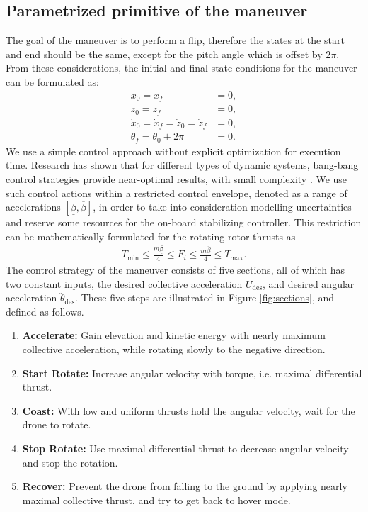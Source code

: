 \subsection{Parametrized primitive of the maneuver}\label{sec:sections}
The goal of the maneuver is to perform a flip, therefore the states at the start and end should be the same, except for the pitch angle which is offset by $2\pi$. From these considerations, the initial and final state conditions for the maneuver can be formulated as:
\begin{subequations}
\begin{align}
x_0 = x_f &= 0,\\
z_0 = z_f &= 0,\\
\dot{x}_0 = \dot{x}_f = \dot{z}_0 = \dot{z}_f &= 0,\\
\theta_f = \theta_0 + 2\pi &= 0.
\end{align}
\end{subequations}
We use a simple control approach without explicit optimization for execution time. Research has shown that for different types of dynamic systems, bang-bang control strategies provide near-optimal results, with small complexity \cite{KALMARNAGY2004,tdk2019}. We use such control actions within a restricted control envelope, denoted as a range of accelerations $[\underline{\beta},\overline{\beta}]$, in order to take into consideration modelling uncertainties and reserve some resources for the on-board stabilizing controller. This restriction can be mathematically formulated for the rotating rotor thrusts as
\begin{align}
T_\mathrm{min} \leq \frac{m\underline{\beta}}{4}\leq F_{i} \leq\frac{m\overline{\beta}}{4} \leq T_\mathrm{max}.
\end{align}
The control strategy of the maneuver consists of five sections, all of which has two constant inputs, the desired collective acceleration $U_\mathrm{des}$, and desired angular acceleration $\ddot{\theta}_\mathrm{des}$. These five steps are illustrated in Figure \ref{fig:sections}, and defined as follows.
\renewcommand{\baselinestretch}{0.85}\normalsize 
\begin{enumerate}
\item \textbf{Accelerate:} Gain elevation and kinetic energy with nearly maximum collective acceleration, while rotating slowly to the negative direction.
\item \textbf{Start Rotate:} Increase angular velocity with torque, i.e. maximal differential thrust.
\item \textbf{Coast:} With low and uniform thrusts hold the angular velocity, wait for the drone to rotate.
\item \textbf{Stop Rotate:} Use maximal differential thrust to decrease angular velocity and stop the rotation.
\item \textbf{Recover:} Prevent the drone from falling to the ground by applying nearly maximal collective thrust, and try to get back to hover mode.
\end{enumerate}
\renewcommand{\baselinestretch}{1.15}\normalsize

